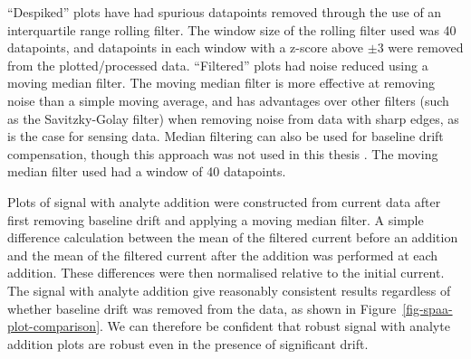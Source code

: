 \documentclass[
  a4paper,
]{scrbook}
\begin{document}
``Despiked'' plots have had spurious datapoints removed through the use
of an interquartile range rolling filter. The window size of the rolling
filter used was 40 datapoints, and datapoints in each window with a
z-score above \(\pm 3\) were removed from the plotted/processed data.
``Filtered'' plots had noise reduced using a moving median filter. The
moving median filter is more effective at removing noise than a simple
moving average, and has advantages over other filters (such as the
Savitzky-Golay filter) when removing noise from data with sharp edges,
as is the case for sensing data. Median filtering can also be used for
baseline drift compensation, though this approach was not used in this
thesis \autocite{Stone2011}. The moving median filter used had a window
of 40 datapoints.

Plots of signal with analyte addition were constructed from current data
after first removing baseline drift and applying a moving median filter.
A simple difference calculation between the mean of the filtered current
before an addition and the mean of the filtered current after the
addition was performed at each addition. These differences were then
normalised relative to the initial current. The signal with analyte
addition give reasonably consistent results regardless of whether
baseline drift was removed from the data, as shown in
Figure~\ref{fig-spaa-plot-comparison}. We can therefore be confident
that robust signal with analyte addition plots are robust even in the
presence of significant drift.
\end{document}
